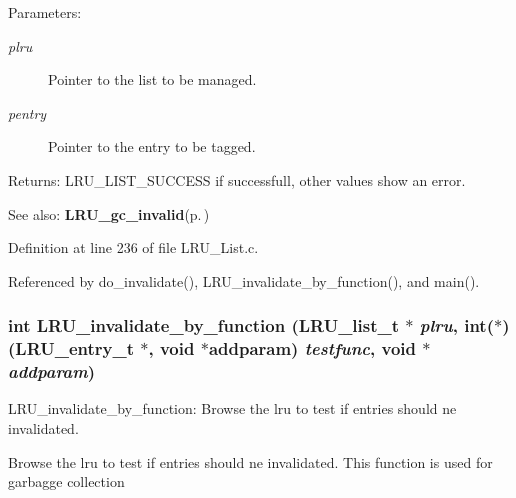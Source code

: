 \begin{Desc}
\item[Parameters:]
\begin{description}
\item[{\em plru}]Pointer to the list to be managed. \item[{\em pentry}]Pointer to the entry to be tagged.\end{description}
\end{Desc}
\begin{Desc}
\item[Returns:]LRU\_\-LIST\_\-SUCCESS if successfull, other values show an error.\end{Desc}
\begin{Desc}
\item[See also:]{\bf LRU\_\-gc\_\-invalid}{\rm (p.\,\pageref{group__LRUExportedFunctions_ga3})} \end{Desc}


Definition at line 236 of file LRU\_\-List.c.

Referenced by do\_\-invalidate(), LRU\_\-invalidate\_\-by\_\-function(), and main().
\subsubsection{\setlength{\rightskip}{0pt plus 5cm}int LRU\_\-invalidate\_\-by\_\-function (LRU\_\-list\_\-t $\ast$ {\em plru}, int($\ast$)(LRU\_\-entry\_\-t $\ast$, void $\ast$addparam) {\em testfunc}, void $\ast$ {\em addparam})}\label{group__LRUExportedFunctions_ga4}


LRU\_\-invalidate\_\-by\_\-function: Browse the lru to test if entries should ne invalidated.

Browse the lru to test if entries should ne invalidated. This function is used for garbagge collection

